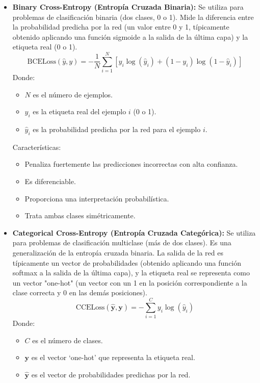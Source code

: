 \documentclass{article}
\begin{document}
\begin{itemize}
    \item \textbf{Binary Cross-Entropy (Entropía Cruzada Binaria):} Se utiliza para problemas de clasificación binaria (dos clases, 0 o 1).  Mide la diferencia entre la probabilidad predicha por la red (un valor entre 0 y 1, típicamente obtenido aplicando una función sigmoide a la salida de la última capa) y la etiqueta real (0 o 1).
        \[
        \text{BCELoss}(\hat{y}, y) = -\frac{1}{N}\sum_{i=1}^{N} [y_i \log(\hat{y}_i) + (1 - y_i) \log(1 - \hat{y}_i)]
        \]
        Donde:
        \begin{itemize}
            \item  \(N\) es el número de ejemplos.
            \item  \(y_i\) es la etiqueta real del ejemplo \(i\) (0 o 1).
            \item  \(\hat{y}_i\) es la probabilidad predicha por la red para el ejemplo \(i\).
        \end{itemize}
        Características:
          \begin{itemize}
             \item Penaliza fuertemente las predicciones incorrectas con alta confianza.
             \item Es diferenciable.
             \item Proporciona una interpretación probabilística.
             \item Trata ambas clases simétricamente.
        \end{itemize}
    \item \textbf{Categorical Cross-Entropy (Entropía Cruzada Categórica):} Se utiliza para problemas de clasificación multiclase (más de dos clases).  Es una generalización de la entropía cruzada binaria.  La salida de la red es típicamente un vector de probabilidades (obtenido aplicando una función softmax a la salida de la última capa), y la etiqueta real se representa como un vector "one-hot" (un vector con un 1 en la posición correspondiente a la clase correcta y 0 en las demás posiciones).
        \[
        \text{CCELoss}(\hat{\mathbf{y}}, \mathbf{y}) = -\sum_{i=1}^{C} y_i \log(\hat{y}_i)
        \]
         Donde:
        \begin{itemize}
            \item \(C\) es el número de clases.
            \item \(\mathbf{y}\) es el vector `one-hot' que representa la etiqueta real.
            \item \(\hat{\mathbf{y}}\) es el vector de probabilidades predichas por la red.
        \end{itemize}
\end{itemize}
\end{document}
